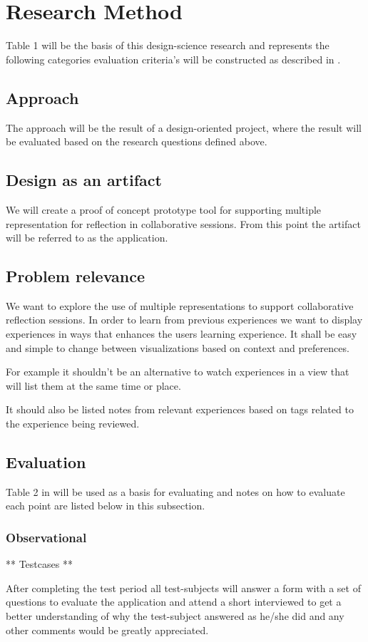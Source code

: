 \section{Research Method}
Table 1 \cite{Esearch2004} will be the basis of this design-science research and represents the following categories evaluation criteria’s will be constructed as described in \cite{Esearch2004}.
\subsection{Approach}
The approach will be the result of a design-oriented project, where the result will be evaluated based on the research questions defined above.
\subsection{Design as an artifact}
We will create a proof of concept prototype tool for supporting multiple representation for reflection in collaborative sessions. From this point the artifact will be referred to as the application.
\subsection{Problem relevance}
We want to explore the use of multiple representations to support collaborative reflection sessions. In order to learn from previous experiences we want to display experiences in ways that enhances the users learning experience. It shall be easy and simple to change between visualizations based on context and preferences. 

For example it shouldn’t be an alternative to watch experiences in a view that will list them at the same time or place.

It should also be listed notes from relevant experiences based on tags related to the experience being reviewed. \cite{Hassan-montero2006}
\subsection{Evaluation}
Table 2 in \cite{Esearch2004} will be used as a basis for evaluating and notes on how to evaluate each point are listed below in this subsection.
\subsubsection{Observational}
** Testcases **

After completing the test period all test-subjects will answer a form with a set of questions to evaluate the application and attend a short interviewed to get a better understanding of why the test-subject answered as he/she did and any other comments would be greatly appreciated.
